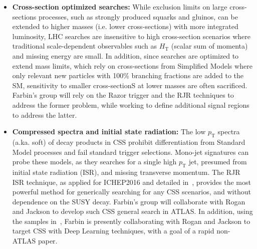 \begin{itemize}
\item \textbf{Cross-section optimized searches:} While exclusion limits
  on large cross-sections processes, such as strongly produced squarks
  and gluinos, can be extended to higher masses (i.e. lower
  cross-sections) with more integrated luminosity, LHC searches are
  insensitive to high cross-section scenarios where traditional
  scale-dependent observables such as $H_\mathrm{T}$ (scalar sum of
  momenta) and missing energy are small. In addition, since searches
  are optimized to extend mass limits, which rely on cross-sections
  from Simplified Models where only relevant new particles with 100\%
  branching fractions are added to the SM, sensitivity to smaller
  cross-sectionS at lower masses are often sacrificed. Farbin's group
  will rely on the Razor trigger and the RJR techniques to address the
  former problem, while working to define additional signal regions to
  address the latter.

\item \textbf{Compressed spectra and initial state radiation:} The low
  $p_\mathrm{T}$ spectra (a.ka. soft) of decay products in CSS
  prohibit differentiation from Standard Model processes and fail
  standard trigger selections.  Mono-jet signatures can probe these
  models, as they searches for a single high $p_\mathrm{T}$ jet,
  presumed from initial state radiation (ISR), and missing transverse
  momentum. The RJR ISR technique, as applied for ICHEP2016 and
  detailed in~\cite{}, provides the most powerful method for
  generically searching for any CSS scenarios, and without dependence
  on the SUSY decay. Farbin's group will collaborate with Rogan and
  Jackson to develop such CSS general search in ATLAS. In addition,
  using the samples in~\cite{}, Farbin is presently collaborating with
  Rogan and Jackson to target CSS with Deep Learning techniques,
  with a goal of a rapid non-ATLAS paper.


\end{itemize}

